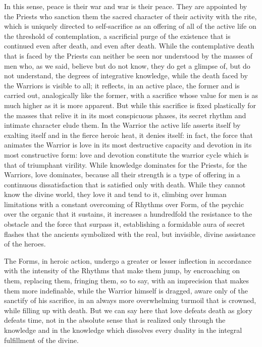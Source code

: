 In this sense, peace is their war and war is their peace. They are appointed by the Priests who sanction them the sacred character of their activity with the rite, which is uniquely directed to self-sacrifice as an offering of all of the active life on the threshold of contemplation, a sacrificial purge of the existence that is continued even after death, and even after death. While the contemplative death that is faced by the Priests can neither be seen nor understood by the masses of men who, as we said, believe but do not know, they do get a glimpse of, but do not understand, the degrees of integrative knowledge, while the death faced by the Warriors is visible to all; it reflects, in an active place, the former and is carried out, analogically like the former, with a sacrifice whose value for men is as much higher as it is more apparent. But while this sacrifice is fixed plastically for the masses that relive it in its most conspicuous phases, its secret rhythm and intimate character elude them. In the Warrior the active life asserts itself by exalting itself and in the fierce heroic heat, it denies itself: in fact, the force that animates the Warrior is love in its most destructive capacity and devotion in its most constructive form: love and devotion constitute the warrior cycle which is that of triumphant virility. While knowledge dominates for the Priests, for the Warriors, love dominates, because all their strength is a type of offering in a continuous dissatisfaction that is satisfied only with death. While they cannot know the divine world, they love it and tend to it, climbing over human limitations with a constant overcoming of Rhythms over Form, of the psychic over the organic that it sustains, it increases a hundredfold the resistance to the obstacle and the force that surpass it, establishing a formidable aura of secret flashes that the ancients symbolized with the real, but invisible, divine assistance of the heroes.

The Forms, in heroic action, undergo a greater or lesser inflection in accordance with the intensity of the Rhythms that make them jump, by encroaching on them, replacing them, fringing them, so to say, with an imprecision that makes them more indefinable, while the Warrior himself is dragged, aware only of the sanctify of his sacrifice, in an always more overwhelming turmoil that is crowned, while filling up with death. But we can say here that love defeats death as glory defeats time, not in the absolute sense that is realized only through the knowledge and in the knowledge which dissolves every duality in the integral fulfillment of the divine.

